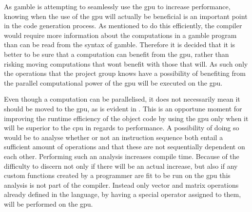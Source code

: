 As \gls{gamble} is attempting to seamlessly use the \acrshort{gpu} to increase performance, knowing when the use of the \acrshort{gpu} will actually be beneficial is an important point in the code generation process. 
As mentioned to do this efficiently, the compiler would require more information about the computations in a \gls{gamble} program than can be read from the syntax of \gls{gamble}.
Therefore it is decided that it is better to be sure that a computation can benefit from the \acrshort{gpu}, rather than risking moving computations that wont benefit with those that will.
As such only the operations that the project group knows have a possibility of benefiting from the parallel computational power of the \acrshort{gpu} will be executed on the \acrshort{gpu}.

Even though a computation can be parallelised, it does not necessarily mean it should be moved to the \acrshort{gpu}, as is evident in .
This is an opportune moment for improving the runtime efficiency of the object code by using the \acrshort{gpu} only when it will be superior to the \acrshort{cpu} in regards to performance.
A possibility of doing so would be to analyse whether or not an instruction sequence both entail a sufficient amount of operations and that these are not sequentially dependent on each other.
Performing such an analysis increases compile time.
Because of the difficulty to discern not only if there will be an actual increase, but also if any custom functions created by a programmer are fit to be run on the \acrshort{gpu} this analysis is not part of the compiler.
Instead only vector and matrix operations already defined in the language, by having a special operator assigned to them, will be performed on the \acrshort{gpu}.

